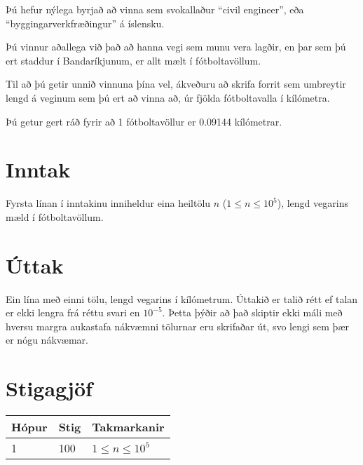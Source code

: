 
Þú hefur nýlega byrjað að vinna sem svokallaður ``civil engineer'', eða ``byggingarverkfræðingur'' á íslensku.

Þú vinnur aðallega við það að hanna vegi sem munu vera lagðir, en þar sem þú ert staddur í Bandaríkjunum, er allt mælt í fótboltavöllum.

Til að þú getir unnið vinnuna þína vel, ákveðuru að skrifa forrit sem umbreytir lengd á veginum sem þú ert að vinna að, úr fjölda fótboltavalla í kílómetra.

Þú getur gert ráð fyrir að 1 fótboltavöllur er 0.09144 kílómetrar.

\section*{Inntak}
Fyrsta línan í inntakinu inniheldur eina heiltölu $n$ ($1 \leq n \leq
    10^5$), lengd vegarins mæld í fótboltavöllum.

\section*{Úttak}
Ein lína með einni tölu, lengd vegarins í kílómetrum.
Úttakið er talið rétt ef talan er ekki lengra frá réttu svari en $10^{-5}$.
Þetta þýðir að það skiptir ekki máli með hversu margra aukastafa nákvæmni 
tölurnar eru skrifaðar út, svo lengi sem þær er nógu nákvæmar.
\section*{Stigagjöf}
\begin{tabular}{|l|l|l|}
    \hline
    Hópur & Stig & Takmarkanir          \\ \hline
    1     & 100  & $1 \leq n \leq 10^5$ \\ \hline
\end{tabular}

